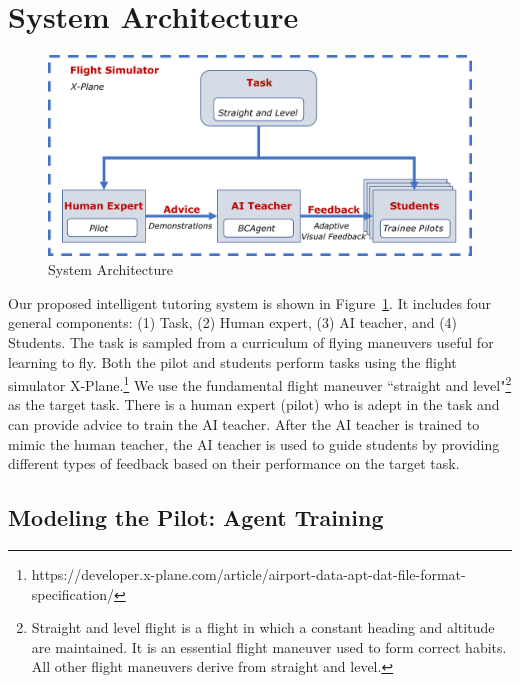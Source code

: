 \documentclass[letterpaper]{article} %
\begin{document}
\section{System Architecture}
\begin{figure}[t]
	\begin{minipage}{1\linewidth}
		\centering \small
		\includegraphics[width=\textwidth]{img/system1.pdf} 
		\caption{System Architecture} 
		\label{fig:system}
	\end{minipage}
\end{figure}
 
Our proposed intelligent tutoring system is shown in Figure~\ref{fig:system}. It includes four general components: (1) Task, (2) Human expert, (3) AI teacher, and (4) Students. The task is sampled from a curriculum of flying maneuvers useful for learning to fly. Both the pilot and students perform tasks using the flight simulator X-Plane.\footnote{https://developer.x-plane.com/article/airport-data-apt-dat-file-format-specification/} We use the fundamental flight maneuver ``straight and level"\footnote{\label{note1}Straight and level flight is a flight in which a constant heading and altitude are maintained. It is an essential flight maneuver used to form correct habits. All other flight maneuvers derive from straight and level.} as the target task. There is a human expert (pilot) who is adept in the task and can provide advice to train the AI teacher. After the AI teacher is trained to mimic the human teacher, the AI teacher is used to guide students by providing different types of feedback based on their performance on the target task. 

\subsection{Modeling the Pilot: Agent Training}
\end{document}
